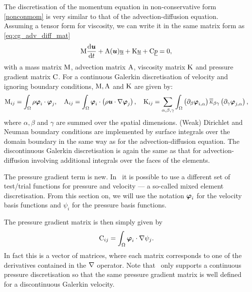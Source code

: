\label{sec:ND_momentum_equation}
The discretisation of the momentum equation in non-conservative
form \eqref{nonconmom} is very similar to that of the advection-diffusion
equation. Assuming a tensor form for viscosity, we
can write it in the same matrix form as
\eqref{eq:cg_adv_diff_mat}
\begin{equation}\label{eq:momentum_equation}
  \mathrm{M} \frac{\mathrm{d}{\mbox{\boldmath$u$}}}{\mathrm{d} t}
    +\mathrm{A}({\mbox{\boldmath$u$}})\underline{u}+\mathrm{K}\underline{ u}
    +\mathrm{C} \underline{p}
    =0,
\end{equation}
with a mass matrix $\mathrm{M}$, advection matrix $\mathrm{A}$,
viscosity matrix $\mathrm{K}$ and pressure gradient matrix $\mathrm{C}$.
For a continuous Galerkin discretisation of
velocity and ignoring boundary conditions, $\mathrm{M}, \mathrm{A}$ and $\mathrm{K}$
are given by:
\begin{equation}
  \mathrm{M}_{ij}=\int_\Omega \rho{\mbox{\boldmath$\varphi$}}_i\cdot{\mbox{\boldmath$\varphi$}}_j, \quad
  \mathrm{A}_{ij}=\int_\Omega {\mbox{\boldmath$\varphi$}}_i\cdot\left(\rho{\mbox{\boldmath$u$}}\cdot\nabla {\mbox{\boldmath$\varphi$}}_j\right), \quad
  \mathrm{K}_{ij}=\sum_{\alpha,\beta,\gamma} \int_\Omega
    \left(\partial_\beta{\mbox{\boldmath$\varphi$}}_{i,\alpha}\right) \overline{\overline{\kappa}}_{\beta\gamma}
      \left(\partial_\gamma {\mbox{\boldmath$\varphi$}}_{j,\alpha}\right),
\end{equation}
where $\alpha,\beta$ and $\gamma$ are summed over the spatial dimensions.
(Weak) Dirichlet and Neuman boundary conditions are implemented by
surface integrals over the domain boundary in the same way
as for the advection-diffusion equation. The discontinuous Galerkin
discretisation is again the same as that for advection-diffusion
involving additional integrals over the faces of the elements.

The pressure gradient term is new. In \fluidity\ it is possible
to use a different set of test/trial functions for pressure
and velocity --- a so-called mixed element discretisation. From this section
on, we will use the notation ${\mbox{\boldmath$\varphi$}}_i$ for the velocity
basis functions and $\psi_i$ for the pressure basis functions.

The pressure gradient matrix is then simply given by
\begin{equation}
  \mathrm{C}_{ij}=\int_\Omega {\mbox{\boldmath$\varphi$}}_i\cdot\nabla\psi_j. \label{pgmatrix}
\end{equation}
In fact this is a vector of matrices, where each matrix corresponds
to one of the derivatives contained in the $\nabla$ operator. Note that \fluidity\ only supports
a continuous pressure discretisation so that the same
pressure gradient matrix is well defined for a discontinuous Galerkin
velocity.

